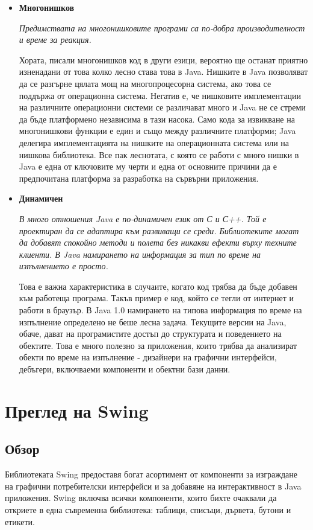 \begin{itemize}
  \item \textbf{Многонишков}

       \emph{Предимствата на многонишковите програми са по-добра
       производителност и време за реакция.}

       Хората, писали многонишков код в други езици, вероятно ще
       останат приятно изненадани от това колко лесно става това в
       Java. Нишките в Java позволяват да се разгърне цялата мощ на
       многопроцесорна система, ако това се поддържа от операционна
       система. Негатив е, че нишковите имплементации на различните
       операционни системи се различават много и Java не се стреми да
       бъде платформено независима в тази насока. Само кода за
       извикване на многонишкови функции е един и също между
       различните платформи; Java делегира имплементацията на нишките
       на операционната система или на нишкова библиотека. Все пак
       леснотата, с която се работи с много нишки в Java е една от
       ключовите му черти и една от основните причини да е
       предпочитана платформа за разработка на сървърни приложения.


  \item \textbf{Динамичен}

    \emph{В много отношения Java е по-динамичен език от С и С++. Той е
    проектиран да се адаптира към развиващи се среди. Библиотеките
    могат да добавят спокойно методи и полета без никакви ефекти върху
    техните клиенти. В Java намирането на информация за тип по време
    на изпълнението е просто.}

    Това е важна характеристика в случаите, когато код трябва да бъде
    добавен към работеща програма. Такъв пример е код, който се тегли
    от интернет и работи в браузър. В Java 1.0 намирането на типова
    информация по време на изпълнение определено не беше лесна
    задача. Текущите версии на Java, обаче, дават на програмистите
    достъп до структурата и поведението на обектите. Това е много
    полезно за приложения, които трябва да анализират обекти по време
    на изпълнение - дизайнери на графични интерфейси, дебъгери,
    включваеми компоненти и обектни бази данни.

\end{itemize}
\section{Преглед на Swing}
\subsection{Обзор}
Библиотеката Swing предоставя богат асортимент от компоненти за
изграждане на графични потребителски интерфейси и за добавяне на
интерактивност в Java приложения. Swing включва всички компоненти,
които бихте очаквали да откриете в една съвременна библиотека:
таблици, списъци, дървета, бутони и етикети.

